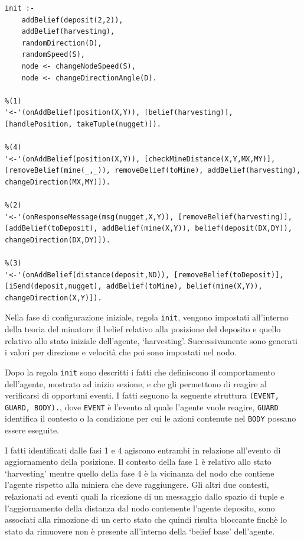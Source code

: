 \switchToProlog{}
\medskip
\begin{lstlisting}[float,firstnumber=1,label={lst:Miner},caption={Teoria minatore}]
init :-
    addBelief(deposit(2,2)),
    addBelief(harvesting),
    randomDirection(D),
    randomSpeed(S),
    node <- changeNodeSpeed(S),
    node <- changeDirectionAngle(D).

%(1)
'<-'(onAddBelief(position(X,Y)), [belief(harvesting)], [handlePosition, takeTuple(nugget)]).

%(4)
'<-'(onAddBelief(position(X,Y)), [checkMineDistance(X,Y,MX,MY)], [removeBelief(mine(_,_)), removeBelief(toMine), addBelief(harvesting), changeDirection(MX,MY)]).

%(2)
'<-'(onResponseMessage(msg(nugget,X,Y)), [removeBelief(harvesting)], [addBelief(toDeposit), addBelief(mine(X,Y)), belief(deposit(DX,DY)), changeDirection(DX,DY)]).

%(3)
'<-'(onAddBelief(distance(deposit,ND)), [removeBelief(toDeposit)], [iSend(deposit,nugget), addBelief(toMine), belief(mine(X,Y)), changeDirection(X,Y)]).
\end{lstlisting}

Nella fase di configurazione iniziale, regola \texttt{init}, vengono impostati all'interno della teoria del minatore il belief relativo alla posizione del deposito e quello relativo allo stato iniziale dell'agente, `harvesting'. Successivamente sono generati i valori per direzione e velocità che poi sono impostati nel nodo.

Dopo la regola \texttt{init} sono descritti i fatti che definiscono il comportamento dell'agente, mostrato ad inizio sezione, e che gli permettono di reagire al verificarsi di opportuni eventi.
I fatti seguono la seguente struttura \texttt{\leftArrow(EVENT, GUARD, BODY).}, dove \texttt{EVENT} è l'evento al quale l'agente vuole reagire, \texttt{GUARD} identifica il contesto o la condizione per cui le azioni contenute nel \texttt{BODY} possano essere eseguite.

I fatti identificati dalle fasi 1 e 4 agiscono entrambi in relazione all'evento di aggiornamento della posizione. Il contesto della fase 1 è relativo allo stato `harvesting' mentre quello della fase 4 è la vicinanza del nodo che contiene l'agente rispetto alla miniera che deve raggiungere.
Gli altri due contesti, relazionati ad eventi quali la ricezione di un messaggio dallo spazio di tuple e l'aggiornamento della distanza dal nodo contenente l'agente deposito, sono associati alla rimozione di un certo stato che quindi risulta bloccante finchè lo stato da rimuovere non è presente all'interno della `belief base' dell'agente.

